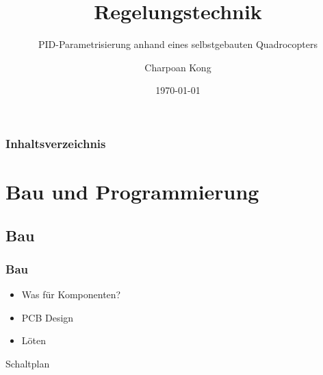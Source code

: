 \documentclass[12pt,a4paper, ngerman]{beamer}
\title{Regelungstechnik}
\subtitle{PID-Parametrisierung anhand eines selbstgebauten Quadrocopters}
\author{Charpoan Kong}
\institute{Kantonsschule Zürich Nord}
\date{\today}
\begin{document}
\begin{frame}
\titlepage
\end{frame}

\begin{frame}
\frametitle{Inhaltsverzeichnis}
\tableofcontents
\end{frame}

\section{Bau und Programmierung}
\subsection{Bau}
 
\begin{frame}
\frametitle{Bau}
\begin{itemize}
\item Was für Komponenten?
\item PCB Design
\item Löten
\end{itemize}
\end{frame}

\begin{frame}
Schaltplan
\end{frame}
\end{document}
